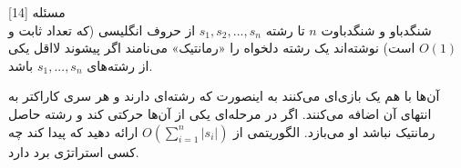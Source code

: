 ‌مسئله [14]
\\
شنگدباو و شنگدباوت 
 $n$
 تا رشته 
 $s_1, s_2,..., s_n$
 از حروف انگلیسی (که تعداد ثابت و 
 $O(1)$
 است) نوشته‌اند یک رشته دلخواه را «رمانتیک» می‌نامند اگر پیشوند لااقل یکی از رشته‌های 
 $s_1, ..., s_n$
 باشد.
 
 آن‌ها با هم یک بازی‌ای می‌کنند به اینصورت که رشته‌ای دارند و هر سری کاراکتر به انتهای آن اضافه می‌کنند. اگر در مرحله‌ای یکی از آن‌ها حرکتی کند و رشته حاصل رمانتیک نباشد او می‌بازد.  الگوریتمی از 
 $O(\sum_{i=1}^{n} |s_i|)$
 ارائه دهید که پیدا کند چه کسی استراتژی برد دارد.


% 
%
%
% 



